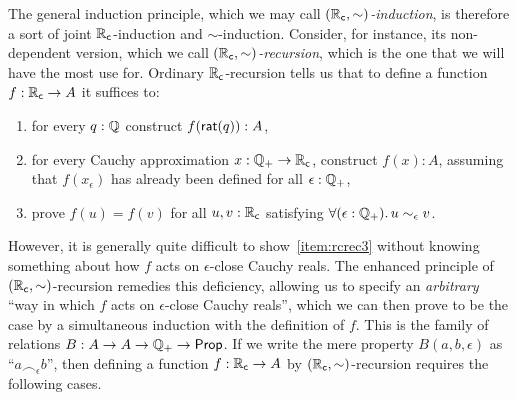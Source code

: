 The general induction principle, which we may call \emph{$(\mathbb{R}_\mathsf{c},\sim)$-induction}, is therefore a sort of joint $\mathbb{R}_\mathsf{c}$-induction and $\sim$-induction.
Consider, for instance, its non-dependent version, which we call \emph{$(\mathbb{R}_\mathsf{c},\sim)$-recursion}, which is the one that we will have the most use for.
Ordinary $\mathbb{R}_\mathsf{c}$-recursion tells us that to define a function $f : \mathbb{R}_\mathsf{c} \to A$ it suffices to:
\begin{enumerate}
\item for every $q : \mathbb{Q}$ construct $f(\mathsf{rat}(q)) : A$,
\item for every Cauchy approximation $x : \mathbb{Q}_{+} \to \mathbb{R}_\mathsf{c}$, construct $f(x) : A$,
  assuming that $f(x_\epsilon)$ has already been defined for all $\epsilon : \mathbb{Q}_{+}$,
\item prove $f(u) = f(v)$ for all $u, v : \mathbb{R}_\mathsf{c}$ satisfying $\fall{\epsilon:\Qp} u\sim_\epsilon v$.\label{item:rcrec3}
\end{enumerate}
However, it is generally quite difficult to show~\ref{item:rcrec3} without knowing something about how $f$ acts on $\epsilon$-close Cauchy reals.
The enhanced principle of $(\mathbb{R}_\mathsf{c},\sim)$-recursion remedies this deficiency, allowing us to specify an \emph{arbitrary} ``way in which $f$ acts on $\epsilon$-close Cauchy reals'', which we can then prove to be the case by a simultaneous induction with the definition of $f$.
This is the family of relations $B:A\to A\to \mathbb{Q}_{+}\to\mathsf{Prop}$.
\newcommand{\bsim}{\frown}
\newcommand{\bbsim}{\smile}
If we write the mere property $B(a,b,\epsilon)$ as ``$a \bsim_\epsilon b$'', then defining a function $f:\mathbb{R}_\mathsf{c}\to A$ by $(\mathbb{R}_\mathsf{c},\sim)$-recursion requires the following cases.
